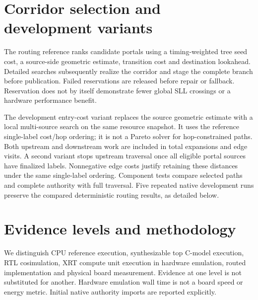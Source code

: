 \documentclass[10pt]{article}
\begin{document}
\section{Corridor selection and development variants}
The routing reference ranks candidate portals using a timing-weighted tree
seed cost, a source-side geometric estimate, transition cost and destination
lookahead. Detailed searches subsequently realize the corridor and stage the
complete branch before publication. Failed reservations are released before
repair or fallback. Reservation does not by itself demonstrate fewer global
SLL crossings or a hardware performance benefit.

The development entry-cost variant replaces the source geometric estimate
with a local multi-source search on the same resource snapshot. It uses the
reference single-label cost/hop ordering; it is not a Pareto solver for
hop-constrained paths. Both upstream and downstream work are included in total
expansions and edge visits. A second variant stops upstream traversal once all
eligible portal sources have finalized labels. Nonnegative edge costs justify
retaining these distances under the same single-label ordering. Component
tests compare selected paths and complete authority with full traversal.
Five repeated native development runs preserve the compared deterministic
routing results, as detailed below.

\section{Evidence levels and methodology}
We distinguish CPU reference execution, synthesizable top C-model execution,
RTL cosimulation, XRT compute unit execution in hardware emulation, routed
implementation and physical board measurement. Evidence at one level is not
substituted for another. Hardware emulation wall time is not a board speed or
energy metric. Initial native authority imports are reported explicitly.
\end{document}
